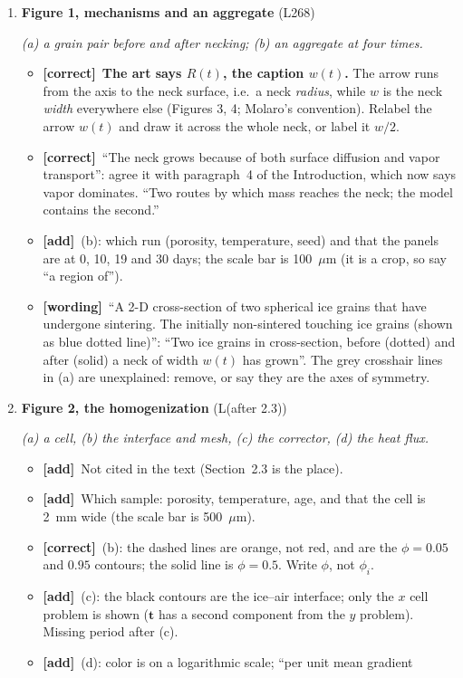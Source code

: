 \documentclass[11pt]{article}
\newcommand{\Pg}[3]{\item \textbf{#1} {\small(#2)}\par\textit{#3}}
\newcommand{\tC}{\textcolor{miss}{\textbf{[correct]}}\ }
\newcommand{\tG}{\textcolor{stale}{\textbf{[wording]}}\ }
\newcommand{\tA}{\textcolor{have}{\textbf{[add]}}\ }
\begin{document}
\begin{enumerate}
\Pg{Figure 1, mechanisms and an aggregate}{L268}{(a) a grain pair before and after necking; (b) an aggregate at four times.}
  \begin{itemize}
  \item \tC \textbf{The art says $R(t)$, the caption $w(t)$.} The arrow runs
    from the axis to the neck surface, i.e.\ a neck \emph{radius}, while $w$
    is the neck \emph{width} everywhere else (Figures 3, 4; Molaro's
    convention). Relabel the arrow $w(t)$ and draw it across the whole neck,
    or label it $w/2$.
  \item \tC ``The neck grows because of both surface diffusion and vapor
    transport'': agree it with paragraph~4 of the Introduction, which now
    says vapor dominates. ``Two routes by which mass reaches the neck; the
    model contains the second.''
  \item \tA (b): which run (porosity, temperature, seed) and that the panels
    are at 0, 10, 19 and 30 days; the scale bar is 100~$\mu$m (it is a
    crop, so say ``a region of'').
  \item \tG ``A 2-D cross-section of two spherical ice grains that have
    undergone sintering. The initially non-sintered touching ice grains
    (shown as blue dotted line)'': ``Two ice grains in cross-section, before
    (dotted) and after (solid) a neck of width $w(t)$ has grown''. The grey
    crosshair lines in (a) are unexplained: remove, or say they are the axes
    of symmetry.
  \end{itemize}
\Pg{Figure 2, the homogenization}{L(after 2.3)}{(a) a cell, (b) the interface and mesh, (c) the corrector, (d) the heat flux.}
  \begin{itemize}
  \item \tA Not cited in the text (Section~2.3 is the place).
  \item \tA Which sample: porosity, temperature, age, and that the cell is
    2~mm wide (the scale bar is 500~$\mu$m).
  \item \tC (b): the dashed lines are orange, not red, and are the
    $\phi = 0.05$ and $0.95$ contours; the solid line is $\phi = 0.5$.
    Write $\phi$, not $\phi_i$.
  \item \tA (c): the black contours are the ice--air interface; only the
    $x$ cell problem is shown ($\mathbf{t}$ has a second component from the
    $y$ problem). Missing period after (c).
  \item \tA (d): color is on a logarithmic scale; ``per unit mean gradient

\end{itemize}
\end{enumerate}
\end{document}
